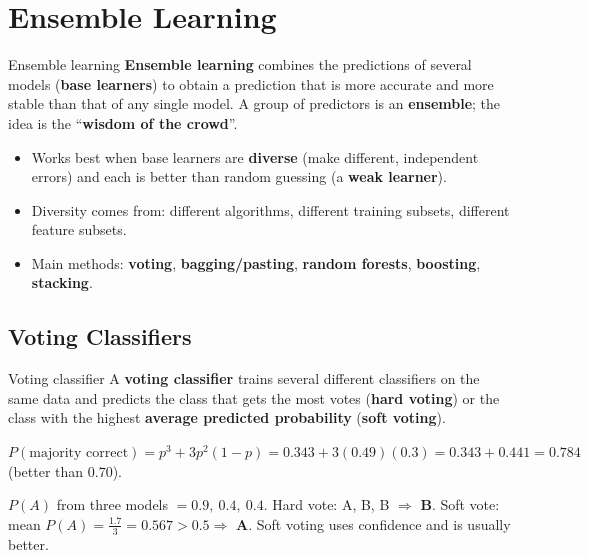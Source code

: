 \chapter{Ensemble Learning}\label{n:ensemble}

\begin{dfn}{Ensemble learning}
\textbf{Ensemble learning} combines the predictions of several models (\textbf{base learners}) to obtain a prediction that is more accurate and more stable than that of any single model. A group of predictors is an \textbf{ensemble}; the idea is the ``\textbf{wisdom of the crowd}''.
\end{dfn}
\begin{itemize}
  \item Works best when base learners are \textbf{diverse} (make different, independent errors) and each is better than random guessing (a \textbf{weak learner}).
  \item Diversity comes from: different algorithms, different training subsets, different feature subsets.
  \item Main methods: \textbf{voting}, \textbf{bagging/pasting}, \textbf{random forests}, \textbf{boosting}, \textbf{stacking}.
\end{itemize}

\section{Voting Classifiers}
\begin{dfn}{Voting classifier}
A \textbf{voting classifier} trains several different classifiers on the same data and predicts the class that gets the most votes (\textbf{hard voting}) or the class with the highest \textbf{average predicted probability} (\textbf{soft voting}).
\end{dfn}
\begin{numer}
$P(\text{majority correct})=p^3+3p^2(1-p)=0.343+3(0.49)(0.3)=0.343+0.441=\mathbf{0.784}$ (better than 0.70).
\end{numer}
\begin{numer}
$P(A)$ from three models $=0.9,\ 0.4,\ 0.4$. Hard vote: A, B, B $\Rightarrow$ \textbf{B}. Soft vote: mean $P(A)=\frac{1.7}3=0.567>0.5\Rightarrow$ \textbf{A}. Soft voting uses confidence and is usually better.
\end{numer}

